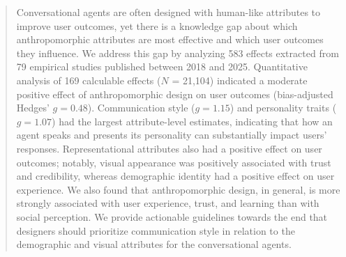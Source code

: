 \documentclass[preprint,review,12pt,authoryear,nonatbib]{elsarticle}
\begin{document}
\begin{frontmatter}
\begin{abstract}
Conversational agents are often designed with human-like attributes to improve user outcomes, yet there is a knowledge gap about which anthropomorphic attributes are most effective and which user outcomes they influence. We address this gap by analyzing 583 effects extracted from 79 empirical studies published between 2018 and 2025. Quantitative analysis of 169 calculable effects ($N$ = 21,104) %
indicated a moderate positive effect of anthropomorphic design on user outcomes (bias-adjusted Hedges' $g = 0.48$). Communication style ($g = 1.15$) and personality traits ($g = 1.07$) had the largest attribute-level estimates, indicating that how an agent speaks and presents its personality can substantially impact users’ responses. Representational attributes also had a positive effect on user outcomes; notably, visual appearance was positively associated with trust and credibility, whereas demographic identity had a positive effect on user experience. We also found that anthropomorphic design, in general, is more strongly associated with user experience, trust, and learning than with social perception. We provide actionable guidelines towards the end that designers should prioritize communication style in relation to the demographic and visual attributes for the conversational agents.
\end{abstract}


\end{frontmatter}
\end{document}
